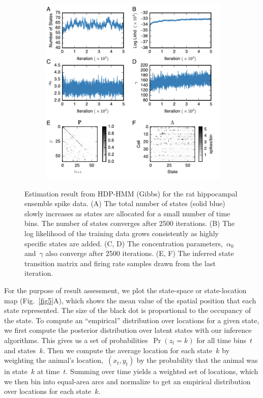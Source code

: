 \begin{figure}[t!]
  \centering
  \begin{subfigure}[t]{5.0in}
    \includegraphics[width=\textwidth]{figures/ch7/Fig6.pdf}
  \end{subfigure}
  \caption[Inferred parameters of the HDP-HMM for hippocampal
    data]{Estimation result from HDP-HMM (Gibbs) for the rat
    hippocampal ensemble spike data. (A) The total number of states
    (solid blue) slowly increases as states are allocated for a small
    number of time bins. The number of states converges after 2500
    iterations. (B) The log likelihood of the training data grows
    consistently as highly specific states are added. (C, D) The
    concentration parameters,~$\alpha_0$ and~$\gamma$ also converge
    after 2500 iterations. (E, F) The inferred state transition matrix
    and firing rate samples drawn from the last iteration.  }
  \label{fig6}
\end{figure}

For the purpose of result assessment, we plot the state-space or
state-location map (Fig.~\ref{fig5}A), which shows the mean value of
the spatial position that each state represented. The size of the
black dot is proportional to the occupancy of the state.  To compute
an ``empirical'' distribution over locations for a given state, we
first compute the posterior distribution over latent states with our
inference algorithms. This gives us a set of
probabilities~$\Pr(z_t=k)$ for all time bins~$t$ and states~$k$. Then
we compute the average location for each state~$k$ by weighting the
animal's location,~$(x_t,y_t)$ by the probability that the animal was
in state~$k$ at time~$t$. Summing over time yields a weighted set of
locations, which we then bin into equal-area arcs and normalize to get
an empirical distribution over locations for each state~$k$.

